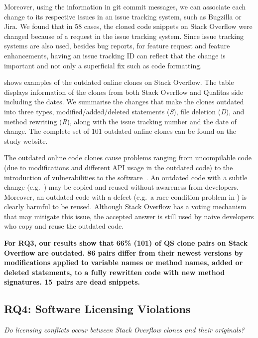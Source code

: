 \documentclass[10pt,journal,compsoc]{IEEEtran}
\begin{document}
Moreover, using the information in git commit messages, we can associate each
change to its respective issues in an issue tracking system, such as Bugzilla or
Jira. We found that in 58 cases, the cloned code snippets on Stack Overflow were
changed because of a request in the issue tracking system. Since issue tracking
systems are also used, besides bug reports, for feature request and feature
enhancements, having an issue tracking ID can reflect that the change is important
and not only a superficial fix such as code formatting.

 shows examples of the outdated online clones on
Stack Overflow. The table displays information of the clones from both Stack
Overflow and Qualitas side including the dates. We summarise the changes that
make the clones outdated into three types, modified/added/deleted statements
(\textit{S}), file deletion (\textit{D}), and method rewriting (\textit{R}),
along with the issue tracking number and the date of change. The complete set of
101 outdated online clones can be found on the study website.

The outdated online code clones cause problems ranging from uncompilable code
(due to modifications and different API usage in the outdated code) to
the introduction of vulnerabilities to the software~\cite{Xia2014}. An outdated code with a
subtle change (e.g.~) may be copied and reused without
awareness from developers. Moreover, an outdated code with a defect (e.g.~a race
condition problem in ) is clearly harmful to be reused.
Although Stack Overflow has a voting mechanism that may mitigate this issue, the
accepted answer is still used by naive developers who copy and reuse the
outdated code.

\textbf{For RQ3, our results show that 66\% (101) of QS clone pairs on Stack
	Overflow are outdated. 86 pairs differ from their newest versions by
	modifications applied to variable names or method names, added or deleted
	statements, to a fully rewritten code with new method signatures. 15~pairs are
	dead snippets.}

\subsection{RQ4: Software Licensing Violations}
\vspace{0.25cm}
\textit{Do
	licensing conflicts occur between Stack Overflow clones and their
	originals?}
\vspace{0.25cm}
\end{document}
